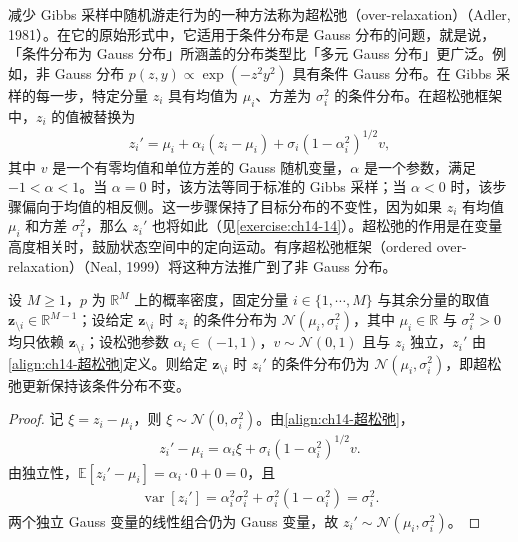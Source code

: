 \documentclass[../../main.tex]{subfiles}
\begin{document}
减少 Gibbs 采样中随机游走行为的一种方法称为超松弛（over-relaxation）（Adler, 1981）。在它的原始形式中，它适用于条件分布是 Gauss 分布的问题，就是说，「条件分布为 Gauss 分布」所涵盖的分布类型比「多元 Gauss 分布」更广泛。例如，非 Gauss 分布 $p(z,y)\propto\exp\left(-z^{2}y^{2}\right)$ 具有条件 Gauss 分布。在 Gibbs 采样的每一步，特定分量 $z_{i}$ 具有均值为 $\mu_{i}$、方差为 $\sigma_{i}^{2}$ 的条件分布。在超松弛框架中，$z_{i}$ 的值被替换为
\begin{align}
z_{i}'=\mu_{i}+\alpha_{i}\left(z_{i}-\mu_{i}\right)+\sigma_{i}\left(1-\alpha_{i}^{2}\right)^{1/2}v,
\label{align:ch14-超松弛}
\end{align}
其中 $v$ 是一个有零均值和单位方差的 Gauss 随机变量，$\alpha$ 是一个参数，满足 $-1<\alpha<1$。当 $\alpha=0$ 时，该方法等同于标准的 Gibbs 采样；当 $\alpha<0$ 时，该步骤偏向于均值的相反侧。这一步骤保持了目标分布的不变性，因为如果 $z_{i}$ 有均值 $\mu_{i}$ 和方差 $\sigma_{i}^{2}$，那么 $z_{i}'$ 也将如此（见\cref{exercise:ch14-14}）。超松弛的作用是在变量高度相关时，鼓励状态空间中的定向运动。有序超松弛框架（ordered over-relaxation）（Neal, 1999）将这种方法推广到了非 Gauss 分布。

\begin{proposition}[超松弛更新保持条件分布]\label{proposition:ch14-超松弛不变}
设 $M\geqslant1$，$p$ 为 $\mathbb{R}^{M}$ 上的概率密度，固定分量 $i\in\{1,\cdots,M\}$ 与其余分量的取值 $\bm{z}_{\setminus i}\in\mathbb{R}^{M-1}$；设给定 $\bm{z}_{\setminus i}$ 时 $z_{i}$ 的条件分布为 $\mathcal{N}(\mu_{i},\sigma_{i}^{2})$，其中 $\mu_{i}\in\mathbb{R}$ 与 $\sigma_{i}^{2}>0$ 均只依赖 $\bm{z}_{\setminus i}$；设松弛参数 $\alpha_{i}\in(-1,1)$，$v\sim\mathcal{N}(0,1)$ 且与 $z_{i}$ 独立，$z_{i}'$ 由\eqref{align:ch14-超松弛}定义。则给定 $\bm{z}_{\setminus i}$ 时 $z_{i}'$ 的条件分布仍为 $\mathcal{N}(\mu_{i},\sigma_{i}^{2})$，即超松弛更新保持该条件分布不变。
\end{proposition}

\begin{proof}
记 $\xi=z_{i}-\mu_{i}$，则 $\xi\sim\mathcal{N}\!\left(0,\sigma_{i}^{2}\right)$。由\eqref{align:ch14-超松弛}，
\begin{align*}
z_{i}'-\mu_{i}=\alpha_{i}\xi+\sigma_{i}\left(1-\alpha_{i}^{2}\right)^{1/2}v.
\end{align*}
由独立性，$\mathbb{E}\left[z_{i}'-\mu_{i}\right]=\alpha_{i}\cdot0+0=0$，且
\begin{align*}
\operatorname{var}\left[z_{i}'\right]=\alpha_{i}^{2}\sigma_{i}^{2}+\sigma_{i}^{2}\left(1-\alpha_{i}^{2}\right)=\sigma_{i}^{2}.
\end{align*}
两个独立 Gauss 变量的线性组合仍为 Gauss 变量，故 $z_{i}'\sim\mathcal{N}\!\left(\mu_{i},\sigma_{i}^{2}\right)$。
\end{proof}
\end{document}
